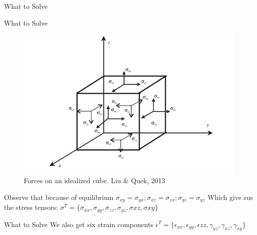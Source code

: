 \documentclass{beamer}
\begin{document}
\begin{section}{What to Solve}
\begin{frame}{What to Solve}
    \begin{figure}
    \quad\includegraphics[scale = 0.3]{Cube.png}
    \caption{Forces on an idealized cube. Liu \& Quek, 2013}
    \end{figure}
    Observe that because of equilibrium $\sigma_{xy} = \sigma_{yx}; \sigma_{xz} = \sigma_{zx}; \sigma_{yz}= \sigma_{yz}$ 
    Which give sus the stress tensors: $\sigma^T = \{\sigma_{xx},\sigma_{yy},\sigma_{zz},\sigma_{yz},\sigma{xz},\sigma{xy}\}$
\end{frame}
\begin{frame}{What to Solve}
    We also get six strain components $\epsilon^T = \{\epsilon_{xx},\epsilon_{yy},\epsilon{zz},\gamma_{yz},\gamma_{xz},\gamma_{xy}\}$
    

\end{frame}
\end{section}
\end{document}
